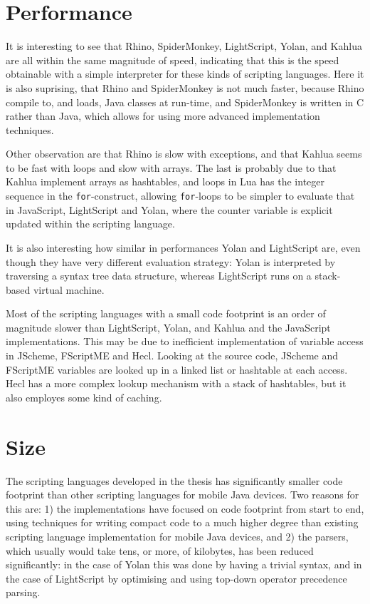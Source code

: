\documentclass[11pt]{report}
\begin{document}
\section{Performance}
It is interesting to see that Rhino, SpiderMonkey, LightScript, Yolan, and Kahlua are all within the same magnitude of speed, indicating that this is the speed obtainable with a simple interpreter for these kinds of scripting languages. Here it is also suprising, that Rhino and SpiderMonkey is not much faster, because Rhino compile to, and loads, Java classes at run-time, and SpiderMonkey is written in C rather than Java, which allows for using more advanced implementation techniques.

Other observation are that Rhino is slow with exceptions, and that Kahlua seems to be fast with loops and slow with arrays. The last is probably due to that Kahlua implement arrays as hashtables, and loops in Lua has the integer sequence in the \verb|for|-construct, allowing \verb|for|-loops to be simpler to evaluate that in JavaScript, LightScript and Yolan, where the counter variable is explicit updated within the scripting language.

It is also interesting how similar in performances Yolan and LightScript are, even though they have very different evaluation strategy: Yolan is interpreted by traversing a syntax tree data structure, whereas LightScript runs on a stack-based virtual machine. 

Most of the scripting languages with a small code footprint is an order of magnitude slower than LightScript, Yolan, and Kahlua and the JavaScript implementations.
This may be due to inefficient implementation of variable access in JScheme, FScriptME and Hecl. Looking at the source code, JScheme and FScriptME variables are looked up in a linked list or hashtable at each access. Hecl has a more complex lookup mechanism with a stack of hashtables, but it also employes some kind of caching.

\section{Size}

The scripting languages developed in the thesis has significantly smaller code footprint than other scripting languages for mobile Java devices.
Two reasons for this are: 1) the implementations have focused on code footprint from start to end, using techniques for writing compact code to a much higher degree than existing scripting language implementation for mobile Java devices, and 2) the parsers, which usually would take tens, or more, of kilobytes, has been reduced significantly: in the case of Yolan this was done by having a trivial syntax, and in the case of LightScript by optimising and using top-down operator precedence parsing.
\end{document}
